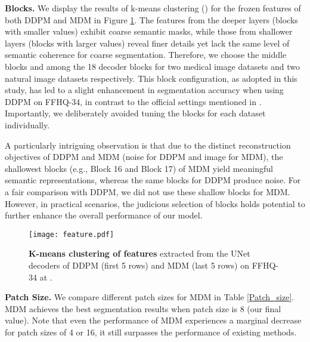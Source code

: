 \documentclass{article} \usepackage{iclr2024_conference,times}
\begin{document}
\textbf{Blocks.} We display the results of k-means clustering () for the frozen features of both DDPM and MDM in Figure \ref{feature}.  
The features from the deeper layers (blocks with smaller values) exhibit coarse semantic masks, while those from shallower layers (blocks with larger values) reveal finer details yet lack the same level of semantic coherence for coarse segmentation. Therefore, we choose the middle blocks  and  among the 18 decoder blocks for two medical image datasets and two natural image datasets respectively. This block configuration, as adopted in this study, has led to a slight enhancement in segmentation accuracy when using DDPM on FFHQ-34, in contrast to the official settings mentioned in \citet{DBLP:conf/iclr/BaranchukVRKB22}. Importantly, we deliberately avoided tuning the blocks for each dataset individually. 

A particularly intriguing observation is that due to the distinct reconstruction objectives of DDPM and MDM (noise for DDPM and image for MDM), the shallowest blocks (e.g., Block 16 and Block 17) of MDM yield meaningful semantic representations, whereas the same blocks for DDPM produce noise. For a fair comparison with DDPM, we did not use these shallow blocks for MDM. However, in practical scenarios, the judicious selection of blocks holds potential to further enhance the overall performance of our model.


\begin{figure}[htp]
\centering
\texttt{[image: feature.pdf]} \caption{\textbf{K-means clustering of features} extracted from the UNet decoders of DDPM (first 5 rows) and MDM (last 5 rows) on FFHQ-34 at . }
\label{feature}
\end{figure}




\textbf{Patch Size.} We compare different patch sizes for MDM in Table \ref{Patch_size}. MDM achieves the best segmentation results when patch size is 8 (our final value). Note that even the performance of MDM experiences a marginal decrease for patch sizes of 4 or 16, it still surpasses the performance of existing methods.
\end{document}
